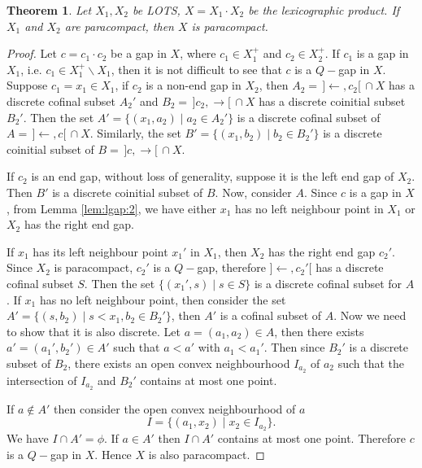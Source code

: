 \documentclass[12pt,oneside,english]{amsbook}
\numberwithin{equation}{section} %
\numberwithin{figure}{section} %
\theoremstyle{plain}
\numberwithin{section}{chapter}
\newtheorem{thm}{Theorem}[section]
\theoremstyle{plain}
\begin{document}
\begin{thm}\label{lp:thm:4}
  Let $X_1, X_2$ be LOTS, $X = X_1 \cdot X_2$ be the lexicographic product. If $X_1$ and $X_2$ are paracompact, then $X$ is paracompact.
\end{thm}
\begin{proof}
  Let $c = c_1 \cdot c_2$ be a gap in $X$, where $c_1 \in X_1^+$ and $c_2 \in X_2^+$. If $c_1$ is a gap in $X_1$, i.e. $c_1 \in X_1^+ \backslash X_1$, then it is not difficult to see that $c$ is a $Q-$gap in $X$. Suppose $c_1 = x_1 \in X_1$, if $c_2$ is a non-end gap in $X_2$, then $A_2 = \, ]\leftarrow, c_2[ \, \cap X$ has a discrete cofinal subset $A_2'$ and $B_2 = \, ]c_2, \rightarrow[ \, \cap X$ has a discrete coinitial subset $B_2'$. Then the set $A' = \{(x_1,a_2) \; | \; a_2 \in A_2' \}$ is a discrete cofinal subset of $A = \, ]\leftarrow, c[ \, \cap X$. Similarly, the set $B' = \{(x_1,b_2) \; | \; b_2 \in B_2' \}$ is a discrete coinitial subset of $B = \, ]c, \rightarrow[  \, \cap X$.

  If $c_2$ is an end gap, without loss of generality, suppose it is the left end gap of $X_2$. Then $B'$ is a discrete coinitial subset of $B$. Now, consider $A$. Since $c$ is a gap in $X$, from Lemma \ref{lem:lgap:2}, we have either $x_1$ has no left neighbour point in $X_1$ or $X_2$ has the right end gap.

  If $x_1$ has its left neighbour point $x_1'$ in $X_1$, then $X_2$ has the right end gap $c_2'$. Since $X_2$ is paracompact, $c_2'$ is a $Q-$gap, therefore $]\leftarrow, c_2'[$ has a discrete cofinal subset $S$. Then the set $\{(x_1',s) \; | \; s \in S \}$ is a discrete cofinal subset for $A$. If $x_1$ has no left neighbour point,
  then consider the set $A' = \{ (s,b_2) \; | \; s < x_1, b_2 \in B_2' \}$, then $A'$ is a cofinal subset of $A$. Now we need to show that it is also discrete. Let $a =(a_1,a_2) \in A $, then there exists $a' = (a_1',b_2') \in A'$ such that $a < a'$ with $a_1 < a_1'$. Then since $B_2'$ is a discrete subset of $B_2$, there exists an open convex neighbourhood $I_{a_2}$ of $a_2$ such that the intersection of $I_{a_2}$ and $B_2'$ contains at most one point.

  If $a \notin A'$ then consider the open convex neighbourhood of $a$ $$I = \{ (a_1, x_2) \; | \; x_2 \in I_{a_2} \}.$$ We have $I \cap A' = \phi$. If $a \in A'$ then $I \cap A'$ contains at most one point. Therefore $c$ is a $Q-$gap in $X$. Hence $X$ is also paracompact.
\end{proof}
\end{document}
